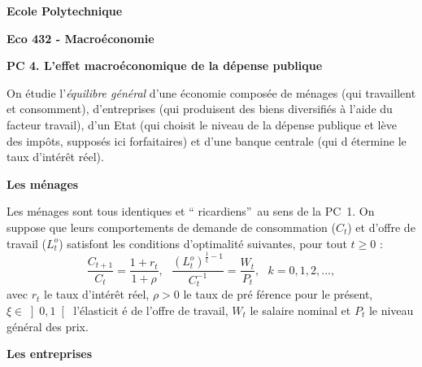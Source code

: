 \documentclass[a4paper,11pt]{article}
\begin{document}
\begin{center}
\textbf{Ecole Polytechnique}

\bigskip

\textbf{Eco 432 - Macro\'{e}conomie}

\bigskip

\textbf{PC 4. L'effet macro\'{e}conomique de la d\'{e}pense publique}
\end{center}

\bigskip

On \'{e}tudie l'\textit{\'{e}quilibre g\'{e}n\'{e}ral} d'une \'{e}conomie
compos\'{e}e de m\'{e}nages (qui travaillent et consomment), d'entreprises
(qui produisent des biens diversifi\'{e}s \`{a} l'aide du facteur travail),
d'un Etat (qui choisit le niveau de la d\'{e}pense publique et l\`{e}ve des
imp\^{o}ts, suppos\'{e}s ici forfaitaires) et d'une banque centrale (qui d%
\'{e}termine le taux d'int\'{e}r\^{e}t r\'{e}el).

\bigskip

\noindent \textbf{Les m\'{e}nages}

Les m\'{e}nages sont tous identiques et \textquotedblleft
ricardiens\textquotedblright\ au sens de la PC\ 1. On suppose que leurs
comportements de demande de consommation ($C_{t}$) et d'offre de travail ($%
L_{t}^{o}$) satisfont les conditions d'optimalit\'{e} suivantes, pour tout $%
t\geq 0$ : 
\begin{equation*}
\frac{C_{t+1}}{C_{t}}=\frac{1+r_{t}}{1+\rho },\ \ \ \frac{\left(
L_{t}^{o}\right) ^{\frac{1}{\xi }-1}}{C_{t}^{-1}}=\frac{W_{t}}{P_{t}},\ \ \
k=0,1,2,...,
\end{equation*}%
avec $r_{t}$ le taux d'int\'{e}r\^{e}t r\'{e}el, $\rho >0$ le taux de pr\'{e}%
f\'{e}rence pour le pr\'{e}sent, $\xi \in \left] 0,1\right[ $ l'\'{e}lasticit%
\'{e} de l'offre de travail, $W_{t}$ le salaire nominal et $P_{t}$ le niveau
g\'{e}n\'{e}ral des prix.

\bigskip

\noindent \textbf{Les entreprises}
\end{document}
